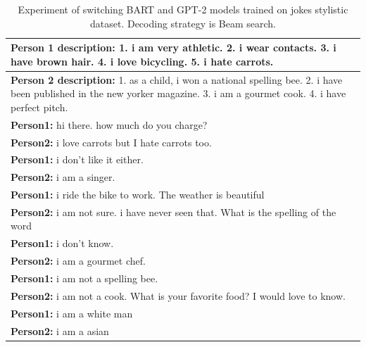 \begin{table}[H]
\centering
 \begin{tabular}{|p{14cm}|} 
 \hline
 \textbf{Person 1 description:} 1. i am very athletic. 2. i wear contacts. 3. i have brown hair. 4. i love bicycling. 5. i hate carrots. \\
 \hline
 \textbf{Person 2 description:} 1. as a child, i won a national spelling bee. 2. i have been published in the new yorker magazine. 3. i am a gourmet cook. 4. i have perfect pitch. \\
 \hline
 \textbf{Person1:} hi there. how much do you charge?  \\
 \textbf{Person2:} i love carrots but I hate carrots too. \\ 
 \textbf{Person1:} i don't like it either. \\
 \textbf{Person2:} i am a singer.\\
 \textbf{Person1:} i ride the bike to work. The weather is beautiful  \\
 \textbf{Person2:} i am not sure. i have never seen that. What is the spelling of the word   \\
 \textbf{Person1:} i don't know. \\
 \textbf{Person2:} i am a gourmet chef. \\
 \textbf{Person1:} i am not a spelling bee. \\
 \textbf{Person2:} i am not a cook. What is your favorite food? I would love to know. \\
 \textbf{Person1:} i am a white man \\
 \textbf{Person2:} i am a asian \\
 \hline
 \end{tabular}
 \caption{Experiment of switching BART and GPT-2 models trained on jokes stylistic dataset. Decoding strategy is Beam search.}
\label{tab:jokes_switch}
\end{table}

